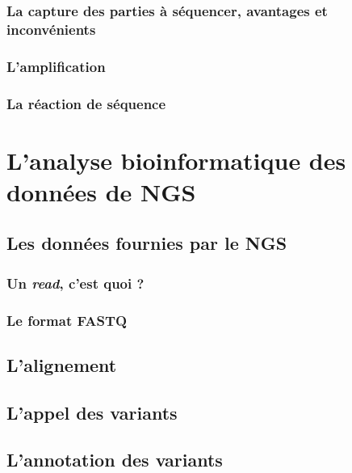 \documentclass[12pt,twoside]{ugathesis}
\begin{document}
\subsubsection{La capture des parties à séquencer, avantages et
inconvénients}\label{la-capture-des-parties-a-sequencer-avantages-et-inconvenients}

\subsubsection{L'amplification}\label{lamplification}

\subsubsection{La réaction de séquence}\label{la-reaction-de-sequence}

\section{L'analyse bioinformatique des données de
NGS}\label{lanalyse-bioinformatique-des-donnees-de-ngs}

\subsection{Les données fournies par le
NGS}\label{les-donnees-fournies-par-le-ngs}

\subsubsection{\texorpdfstring{Un \emph{read}, c'est quoi
?}{Un read, c'est quoi ?}}\label{un-read-cest-quoi}

\subsubsection{Le format FASTQ}\label{fastq}

\subsection{L'alignement}\label{lalignement}

\subsection{L'appel des variants}\label{varcall}

\subsection{L'annotation des variants}\label{lannotation-des-variants}
\end{document}
